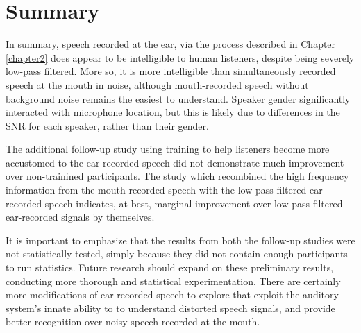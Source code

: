 \section{Summary}

In summary, speech recorded at the ear, via the process described in Chapter \ref{chapter2} does appear to be intelligible to human listeners, despite being severely low-pass filtered.  More so, it is more intelligible than simultaneously recorded speech at the mouth in noise, although mouth-recorded speech without background noise remains the easiest to understand.  Speaker gender significantly interacted with microphone location, but this is likely due to differences in the SNR for each speaker, rather than their gender.  

The additional follow-up study using training to help listeners become more accustomed to the ear-recorded speech did not demonstrate much improvement over non-trainined participants.  The study which recombined the high frequency information from the mouth-recorded speech with the low-pass filtered ear-recorded speech indicates, at best, marginal improvement over low-pass filtered ear-recorded signals by themselves.

It is important to emphasize that the results from both the follow-up studies were not statistically tested, simply because they did not contain enough participants to run statistics.  Future research should expand on these preliminary results, conducting more thorough and statistical experimentation.  There are certainly more modifications of ear-recorded speech to explore that exploit the auditory system's innate ability to to understand distorted speech signals, and provide better recognition over noisy speech recorded at the mouth.

